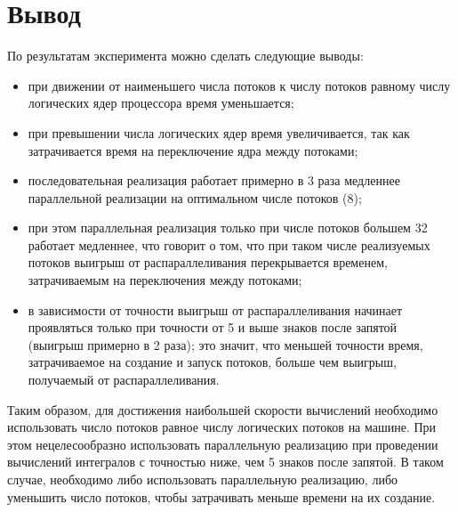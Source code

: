 
\clearpage
\section{Вывод}

По результатам эксперимента можно сделать следующие выводы:
\begin{itemize}[left=\parindent]
    \item при движении от наименьшего числа потоков к числу потоков равному
        числу логических ядер процессора время уменьшается;
    \item при превышении числа логических ядер время увеличивается, так как
        затрачивается время на переключение ядра между потоками;
    \item последовательная реализация работает примерно в 3 раза медленнее
        параллельной реализации на оптимальном числе потоков (8);
    \item при этом параллельная реализация только при числе потоков большем 32
        работает медленнее, что говорит о том, что при таком числе реализуемых
        потоков выигрыш от распараллеливания перекрывается временем,
        затрачиваемым на переключения между потоками;
    \item в зависимости от точности выигрыш от распараллеливания начинает
        проявляться только при точности от 5 и выше знаков после запятой
        (выигрыш примерно в 2 раза); это значит, что меньшей точности время,
        затрачиваемое на создание и запуск потоков, больше чем выигрыш,
        получаемый от распараллеливания.
\end{itemize}

Таким образом, для достижения наибольшей скорости вычислений необходимо
использовать число потоков равное числу логических потоков на машине. При этом
нецелесообразно использовать параллельную реализацию при проведении вычислений
интегралов с точностью ниже, чем 5 знаков после запятой. В таком случае,
необходимо либо использовать параллельную реализацию, либо уменьшить число
потоков, чтобы затрачивать меньше времени на их создание.
